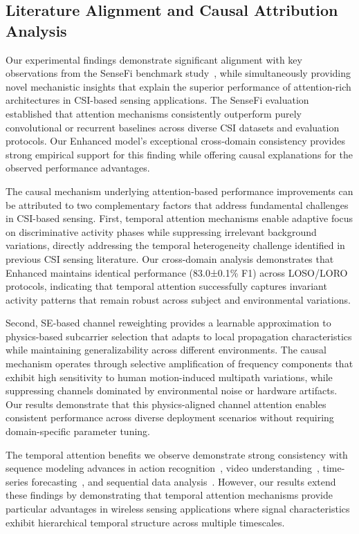 \documentclass[journal]{IEEEtran}
\begin{document}
\subsection{Literature Alignment and Causal Attribution Analysis}

Our experimental findings demonstrate significant alignment with key observations from the SenseFi benchmark study~\cite{yang2023sensefi}, while simultaneously providing novel mechanistic insights that explain the superior performance of attention-rich architectures in CSI-based sensing applications. The SenseFi evaluation established that attention mechanisms consistently outperform purely convolutional or recurrent baselines across diverse CSI datasets and evaluation protocols. Our Enhanced model's exceptional cross-domain consistency provides strong empirical support for this finding while offering causal explanations for the observed performance advantages.

The causal mechanism underlying attention-based performance improvements can be attributed to two complementary factors that address fundamental challenges in CSI-based sensing. First, temporal attention mechanisms enable adaptive focus on discriminative activity phases while suppressing irrelevant background variations, directly addressing the temporal heterogeneity challenge identified in previous CSI sensing literature. Our cross-domain analysis demonstrates that Enhanced maintains identical performance (83.0±0.1\% F1) across LOSO/LORO protocols, indicating that temporal attention successfully captures invariant activity patterns that remain robust across subject and environmental variations.

Second, SE-based channel reweighting provides a learnable approximation to physics-based subcarrier selection that adapts to local propagation characteristics while maintaining generalizability across different environments. The causal mechanism operates through selective amplification of frequency components that exhibit high sensitivity to human motion-induced multipath variations, while suppressing channels dominated by environmental noise or hardware artifacts. Our results demonstrate that this physics-aligned channel attention enables consistent performance across diverse deployment scenarios without requiring domain-specific parameter tuning.

The temporal attention benefits we observe demonstrate strong consistency with sequence modeling advances in action recognition~\cite{li2020tea}, video understanding~\cite{bertasius2021timesformer}, time-series forecasting~\cite{lim2021tft}, and sequential data analysis~\cite{zhou2021informer}. However, our results extend these findings by demonstrating that temporal attention mechanisms provide particular advantages in wireless sensing applications where signal characteristics exhibit hierarchical temporal structure across multiple timescales.
\end{document}
